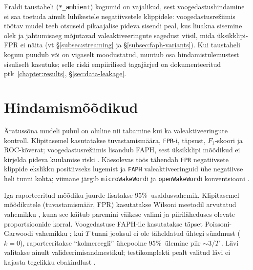 Eraldi taustaheli (\texttt{*\_ambient}) kogumid on vajalikud, sest voogedastushindamine ei saa toetuda ainult lühikestele negatiivsetele klippidele: voogedastusrežiimis töötav mudel teeb otsuseid pikaajalise pideva sisendi peal, kus liu\-akna sisemine olek ja jahtumisaeg mõjutavad valeaktiveeringute sagedust viisil, mida üksikklipi-FPR ei näita (vt §\ref{subsec:streaming} ja §\ref{subsec:faph-variants}). Kui taustaheli kogum puudub või on vigaselt moodustatud, muutub osa hindamistulemustest sisuliselt kasutuks; selle riski empiirilised tagajärjed on dokumenteeritud ptk~\ref{chapter:results}, §\ref{sec:data-leakage}.

\section{Hindamismõõdikud}
Äratussõna mudeli puhul on oluline nii tabamine kui ka valeaktiveeringute kontroll. Klipitasemel kasutatakse tuvastamismäära, \texttt{FPR}-i, täpsust, $F_1$-skoori ja ROC-kõverat; voogedastusrežiimis lisandub FAPH, sest üksikklipi mõõdikud ei kirjelda pideva kuulamise riski \cite{lopezespejo2021deepkws}. Käesolevas töös tähendab \texttt{FPR} negatiivsete klippide ekslikku positiivseks lugemist ja \texttt{FAPH} valeaktiveeringuid ühe negatiivse heli tunni kohta; viimane järgib \texttt{microWakeWord}i ja \texttt{openWakeWord}i konventsiooni \cite{microwakeword2026,openwakeword2026}.

Iga raporteeritud mõõdiku juurde lisatakse 95\%~usaldusvahemik. Klipitasemel mõõdikutele (tuvastamismäär, FPR) kasutatakse Wilsoni meetodil arvutatud vahemikku \cite{wilson1927probable,brown2001interval}, kuna see käitub paremini väikese valimi ja piiriläheduses olevate proportsioonide korral. Voogedastuse FAPH-ile kasutatakse täpset Poissoni-Garwoodi vahemikku \cite{garwood1936fiducial,ulm1990poisson}; kui $T$ tunni jooksul ei ole täheldatud ühtegi sündmust ($k=0$), raporteeritakse \enquote{kolmereegli} ühepoolne 95\%~ülemine piir $\sim 3/T$ \cite{hanley1983ruleofthree}. Lävi valitakse ainult valideerimisandmestikul; testikomplekti pealt valitud lävi ei kajasta tegelikku ebakindlust \cite{cawley2010overfitting}.

